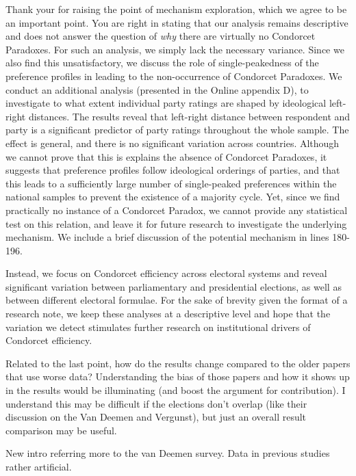 \documentclass[a4paper, 12pt]{scrartcl}
\theoremstyle{break}
\newenvironment{changes}{\par\color{violet}\par\addvspace{\baselineskip}}{\par\addvspace{\baselineskip}}
\begin{document}
Thank your for raising the point of mechanism exploration, which we agree to be an important point. You are right in stating that our analysis remains descriptive and does not answer the question of \textit{why} there are virtually no Condorcet Paradoxes. For such an analysis, we simply lack the necessary variance. Since we also find this unsatisfactory, we discuss the role of single-peakedness of the preference profiles in leading to the non-occurrence of Condorcet Paradoxes. We conduct an additional analysis (presented in the Online appendix D), to investigate to what extent individual party ratings are shaped by ideological left-right distances. The results reveal that left-right distance between respondent and party is a significant predictor of party ratings throughout the whole sample. The effect is general, and there is no significant variation across countries. Although we cannot prove that this is explains the absence of Condorcet Paradoxes, it suggests that preference profiles follow ideological orderings of parties, and that this leads to a sufficiently large number of single-peaked preferences within the national samples to prevent the existence of a majority cycle. Yet, since we find practically no instance of a Condorcet Paradox, we cannot provide any statistical test on this relation, and leave it for future research to investigate the underlying mechanism. We include a brief discussion of the potential mechanism in lines 180-196.

Instead, we focus on Condorcet efficiency across electoral systems and reveal significant variation between parliamentary and presidential elections, as well as between different electoral formulae. For the sake of brevity given the format of a research note, we keep these analyses at a descriptive level and hope that the variation we detect stimulates further research on institutional drivers of Condorcet efficiency.  

\begin{changes}
	Related to the last point, how do the results change compared to the older papers that use worse data? Understanding the bias of those papers and how it shows up in the results would be illuminating (and boost the argument for contribution). I understand this may be difficult if the elections don’t overlap (like their discussion on the Van	Deemen and Vergunst), but just an overall result comparison may be useful.
\end{changes}

New intro referring more to the van Deemen survey. Data in previous studies rather artificial.
\end{document}
